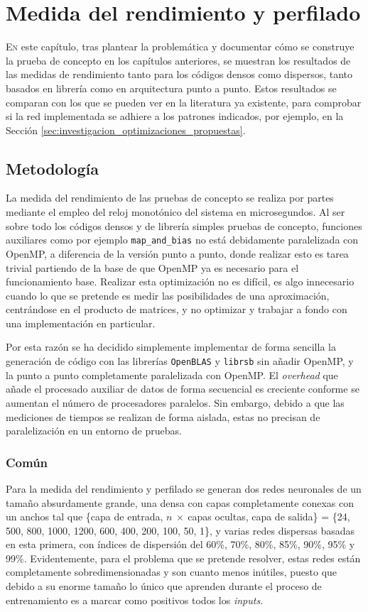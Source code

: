 \chapter{Medida del rendimiento y perfilado}
\label{chap:medida_rendimiento_perfilado}

\lettrine{E}{n} este capítulo, tras plantear la problemática y documentar cómo se construye la prueba de concepto en los capítulos anteriores, se muestran los resultados de las medidas de rendimiento tanto para los códigos densos como dispersos, tanto basados en librería como en arquitectura punto a punto. Estos resultados se comparan con los que se pueden ver en la literatura ya existente, para comprobar si la red implementada se adhiere a los patrones indicados, por ejemplo, en la Sección \ref{sec:investigacion_optimizaciones_propuestas}.

\section{Metodología}
\label{sec:metodologia}
La medida del rendimiento de las pruebas de concepto se realiza por partes mediante el empleo del reloj monotónico del sistema en microsegundos. Al ser sobre todo los códigos densos y de librería simples pruebas de concepto, funciones auxiliares como por ejemplo \texttt{map\_and\_bias} no está debidamente paralelizada con OpenMP, a diferencia de la versión punto a punto, donde realizar esto es tarea trivial partiendo de la base de que OpenMP ya es necesario para el funcionamiento base. Realizar esta optimización no es difícil, es algo innecesario cuando lo que se pretende es medir las posibilidades de una aproximación, centrándose en el producto de matrices, y no optimizar y trabajar a fondo con una implementación en particular.

Por esta razón se ha decidido simplemente implementar de forma sencilla la generación de código con las librerías \texttt{OpenBLAS} y \texttt{librsb} sin añadir OpenMP, y la punto a punto completamente paralelizada con OpenMP. El \textit{overhead} que añade el procesado auxiliar de datos de forma secuencial es creciente conforme se aumentan el número de procesadores paralelos. Sin embargo, debido a que las mediciones de tiempos se realizan de forma aislada, estas no precisan de paralelización en un entorno de pruebas.

\subsection{Común}
\label{ssec:comun_metodologia}
Para la medida del rendimiento y perfilado se generan dos redes neuronales de un tamaño absurdamente grande, una densa con capas completamente conexas con un anchos tal que \{capa de entrada, $n\:\times\:$capas ocultas, capa de salida\} = \{24, 500, 800, 1000, 1200, 600, 400, 200, 100, 50, 1\}, y varias redes dispersas basadas en esta primera, con índices de dispersión del 60\%, 70\%, 80\%, 85\%, 90\%, 95\% y 99\%. Evidentemente, para el problema que se pretende resolver, estas redes están completamente sobredimensionadas y son cuanto menos inútiles, puesto que debido a su enorme tamaño lo único que aprenden durante el proceso de entrenamiento es a marcar como positivos todos los \textit{inputs}.

